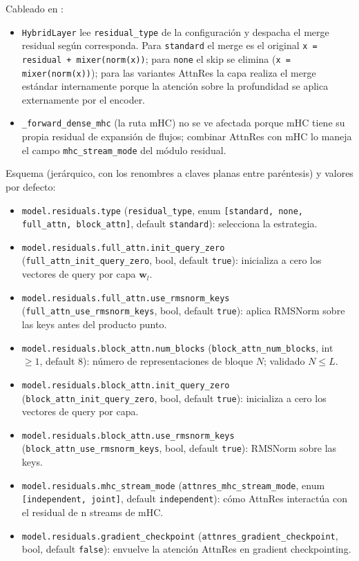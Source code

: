 Cableado en :
\begin{itemize}[leftmargin=*]
    \item \texttt{HybridLayer} lee \texttt{residual\_type} de la
        configuración y despacha el merge residual según corresponda.
        Para \texttt{standard} el merge es el original
        \texttt{x = residual + mixer(norm(x))}; para \texttt{none} el
        skip se elimina (\texttt{x = mixer(norm(x))}); para las
        variantes AttnRes la capa realiza el merge estándar
        internamente porque la atención sobre la profundidad se aplica
        externamente por el encoder.
    \item \texttt{\_forward\_dense\_mhc} (la ruta mHC) no se ve
        afectada porque mHC tiene su propia residual de expansión de
        flujos; combinar AttnRes con mHC lo maneja el campo
        \texttt{mhc\_stream\_mode} del módulo residual.
\end{itemize}

Esquema (jerárquico, con los renombres a claves planas entre
paréntesis) y valores por defecto:
\begin{itemize}[leftmargin=*]
    \item \texttt{model.residuals.type} (\texttt{residual\_type},
        enum \texttt{[standard, none, full\_attn, block\_attn]},
        default \texttt{standard}): selecciona la estrategia.
    \item \texttt{model.residuals.full\_attn.init\_query\_zero}
        (\texttt{full\_attn\_init\_query\_zero}, bool, default
        \texttt{true}): inicializa a cero los vectores de query por
        capa $\mathbf{w}_l$.
    \item \texttt{model.residuals.full\_attn.use\_rmsnorm\_keys}
        (\texttt{full\_attn\_use\_rmsnorm\_keys}, bool, default
        \texttt{true}): aplica RMSNorm sobre las keys antes del
        producto punto.
    \item \texttt{model.residuals.block\_attn.num\_blocks}
        (\texttt{block\_attn\_num\_blocks}, int $\ge 1$, default
        $8$): número de representaciones de bloque $N$; validado
        $N \le L$.
    \item \texttt{model.residuals.block\_attn.init\_query\_zero}
        (\texttt{block\_attn\_init\_query\_zero}, bool, default
        \texttt{true}): inicializa a cero los vectores de query por
        capa.
    \item \texttt{model.residuals.block\_attn.use\_rmsnorm\_keys}
        (\texttt{block\_attn\_use\_rmsnorm\_keys}, bool, default
        \texttt{true}): RMSNorm sobre las keys.
    \item \texttt{model.residuals.mhc\_stream\_mode}
        (\texttt{attnres\_mhc\_stream\_mode}, enum
        \texttt{[independent, joint]}, default \texttt{independent}):
        cómo AttnRes interactúa con el residual de n streams de mHC.
    \item \texttt{model.residuals.gradient\_checkpoint}
        (\texttt{attnres\_gradient\_checkpoint}, bool, default
        \texttt{false}): envuelve la atención AttnRes en gradient
        checkpointing.
\end{itemize}

